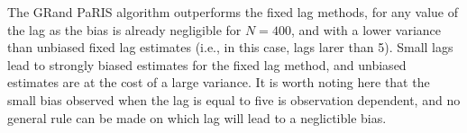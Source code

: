 \documentclass[12pt]{article}
\newcommand{\rmd}{\mathrm{d}}
\newcommand{\eqsp}{\;}
\newcommand{\1}{\mathrm{1}}
\begin{document}
The GRand PaRIS algorithm outperforms the fixed lag methods, for any value of the lag as the bias is already negligible for $N=400$, and with a lower variance than unbiased fixed lag estimates (i.e., in this case, lags larer than 5). Small lags lead to strongly biased estimates for the fixed lag method, and unbiased estimates are at the cost of a large variance. It is worth noting here that the small bias observed when the lag is equal to five is observation dependent, and no general rule can be made on which lag will lead to a neglictible bias. 

%
\end{document}
